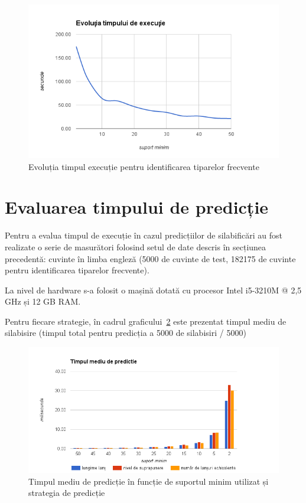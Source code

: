 \begin{figure}[h!]
    \centering
    \includegraphics[width=.9\textwidth]{figures/bide-runtime-en.png}
    \caption{Evoluția timpul execuție pentru identificarea tiparelor frecvente}
    \label{fig:bide-runtime-en}
\end{figure}



\section{Evaluarea timpului de predicție}

Pentru a evalua timpul de execuție în cazul predicțiilor de silabificări au fost realizate o serie de masurători folosind setul de date descris în secțiunea precedentă: cuvinte în limba engleză (5000 de cuvinte de test, 182175 de cuvinte pentru identificarea tiparelor frecvente). 

La nivel de hardware s-a folosit o mașină dotată cu procesor Intel i5-3210M @ 2,5 GHz și 12 GB RAM.

Pentru fiecare strategie, în cadrul graficului~\ref{fig:runtime} este prezentat timpul mediu de silabisire (timpul total pentru predicția a 5000 de silabisiri / 5000)

\begin{figure}[h!]
    \centering
    \includegraphics[width=1\textwidth]{figures/runtime.png}
    \caption{Timpul mediu de predicție în funcție de suportul minim utilizat și strategia de predicție}
    \label{fig:runtime}
\end{figure}

